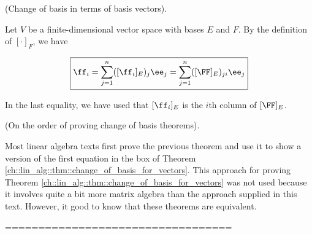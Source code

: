 \begin{theorem}
\label{ch::lin_alg::thm::change_of_basis_with_basis_vectors}
    (Change of basis in terms of basis vectors).
    
    Let $V$ be a finite-dimensional vector space with bases $E$ and $F$. By the definition of $[\cdot]_F$, we have
    
    \begin{align*}
        \boxed
        {
            \ff_i = \sum_{j = 1}^n ([\ff_i]_E)_j \ee_j = \sum_{j = 1}^n ([\FF]_E)_{ji} \ee_j
        }
    \end{align*}
    
    In the last equality, we have used that $[\ff_i]_E$ is the $i$th column of $[\FF]_E$.
\end{theorem}

\begin{remark}
    (On the order of proving change of basis theorems). 
    
    Most linear algebra texts first prove the previous theorem and use it to show a version of the first equation in the box of Theorem \ref{ch::lin_alg::thm::change_of_basis_for_vectors}. This approach for proving Theorem \ref{ch::lin_alg::thm::change_of_basis_for_vectors} was not used because it involves quite a bit more matrix algebra than the approach supplied in this text. However, it good to know that these theorems are equivalent.
\end{remark}

==================================

